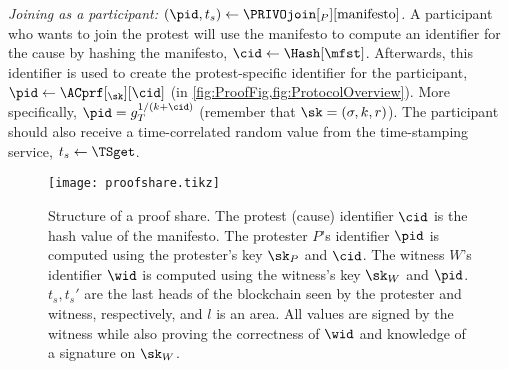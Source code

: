 \emph{Joining as a participant: \((\pid, t_s)\gets 
    \PRIVOjoin[_P][\text{manifesto}]\).}
A participant who wants to join the protest will use the manifesto to compute an identifier for the cause by hashing the manifesto, \(\cid\gets \Hash[\mfst]\).
Afterwards, this identifier is used to create the protest-specific identifier for the participant, \(\pid\gets \ACprf[_{\sk}][\cid]\) (in 
\cref{fig:ProofFig,fig:ProtocolOverview}).
More specifically, \(\pid = g_T^{1/(k+\cid)}\) (remember that \(\sk = (\sigma, k, r)\)).
The participant should also receive a time-correlated random value from the time-stamping service, \(t_s\gets \TSget\).


\begin{figure}
  \centering
  \texttt{[image: proofshare.tikz]}
  \caption{%
    Structure of a proof share.
    The protest (cause) identifier \(\cid\) is the hash value of the manifesto.
    The protester \(P\)'s identifier \(\pid\) is computed using the protester's key \(\sk_P\) and \(\cid\).
    The witness \(W\)'s identifier \(\wid\) is computed using the witness's key \(\sk_W\) and \(\pid\).
    \(t_s, t_s'\) are the last heads of the blockchain seen by the protester and witness, respectively, and \(l\) is an area.
    All values are signed by the witness while also proving the correctness of \(\wid\) and knowledge of a signature on \(\sk_W\).
  }%
  \label{fig:ProofFig}
\end{figure}%

